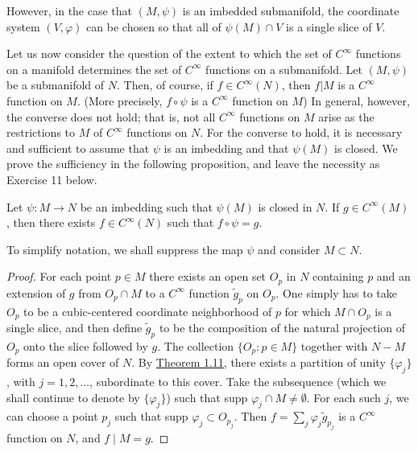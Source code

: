\begin{center}
\end{center}

However, in the case that $(M,\psi)$ is an imbedded submanifold, the coordinate system $(V,\varphi)$ can be chosen so that all of $\psi(M)\cap V$ is a single slice of $V$.

Let us now consider the question of the extent to which the set of $C^{\infty}$ functions on a manifold determines the set of $C^{\infty}$ functions on a submanifold. Let $(M,\psi)$ be a submanifold of $N$. Then, of course, if $f\in C^{\infty}(N)$, then $f|M$ is a $C^{\infty}$ function on $M$. (More precisely, $f\circ\psi$ is a $C^{\infty}$ function on $M$) In general, however, the converse does not hold; that is, not all $C^{\infty}$ functions on $M$ arise as the restrictions to $M$ of $C^{\infty}$ functions on $N$. For the converse to hold, it is necessary and sufficient to assume that $\psi$ is an imbedding and that $\psi(M)$ is closed. We prove the sufficiency in the following proposition, and leave the necessity as Exercise 11 below.

\begin{proposition}\label{thm:1.36}
	Let $\psi: M \to N$ be an imbedding such that $\psi(M)$ is closed in $N$. If $g \in C^{\infty}(M)$, then there exists $f \in C^{\infty}(N)$ such that $f \circ \psi = g$.

	To simplify notation, we shall suppress the map $\psi$ and consider $M \subset N$.

\end{proposition}

\begin{proof}
	For each point $p \in M$ there exists an open set $O_p$ in $N$ containing $p$ and an extension of $g$ from $O_p \cap M$ to a $C^\infty$ function $\tilde{g}_p$ on $O_p$. One simply has to take $O_p$ to be a cubic-centered coordinate neighborhood of $p$ for which $M \cap O_p$ is a single slice, and then define $\tilde{g}_p$ to be the composition of the natural projection of $O_p$ onto the slice followed by $g$. The collection $\{O_p : p \in M\}$ together with $N - M$ forms an open cover of $N$. By \hyperref[thm:1.11]{Theorem 1.11}, there exists a partition of unity $\{\varphi_j\}$, with $j = 1, 2, \ldots$, subordinate to this cover. Take the subsequence (which we shall continue to denote by $\{\varphi_j\}$) such that supp $\varphi_j \cap M \neq \emptyset$. For each such $j$, we can choose a point $p_j$ such that supp $\varphi_j \subset O_{p_j}$. Then $f = \sum_{j} \varphi_j \tilde{g}_{p_j}$ is a $C^\infty$ function on $N$, and $f \mid M = g$.

\end{proof}

